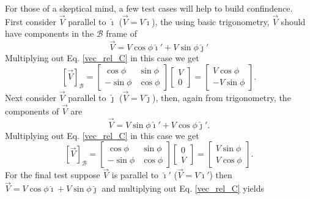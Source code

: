 \documentclass[10pt]{article}
\begin{document}
For those of a skeptical mind, a few test cases will help to build confindence.  First consider 
$\vec V$ parallel to $\hat \imath$ ($\vec V = V \hat \imath$), the using basic trigonometry,
$\vec V$ should have components in the $\mathcal B$ frame of
\begin{equation}\label{vec_test_A}
  \vec V = V \cos \phi \hat \imath' + V \sin \phi \hat \jmath'
\end{equation}
Multiplying out Eq. \ref{vec_rel_C} in this case we get
\begin{equation}
  \left[ \vec V \right]_{\mathcal B}
= \left[ \begin{array}{cc} \cos \phi & \sin \phi \\ -\sin \phi & \cos \phi \end{array} \right] 
  \left[ \begin{array}{c} V \\ 0 \end{array} \right]
= \left[ \begin{array}{c} V \cos \phi \\ -V \sin \phi \end{array} \right].
\end{equation}
Next consider $\vec V$ parallel to $\hat \jmath$ ($\vec V = V \hat \jmath$), then,
again from trigonometry, the components of $\vec V$ are
\begin{equation}\label{vec_test_B}
  \vec V = V \sin \phi \hat \imath' + V \cos \phi \hat \jmath' .
\end{equation}
Multiplying out Eq. \ref{vec_rel_C} in this case we get
\begin{equation}
  \left[ \vec V \right]_{\mathcal B}
= \left[ \begin{array}{cc} \cos \phi & \sin \phi \\ -\sin \phi & \cos \phi \end{array} \right] 
  \left[ \begin{array}{c} 0 \\ V \end{array} \right]
= \left[ \begin{array}{c} V \sin \phi \\ V \cos \phi \end{array} \right].
\end{equation}
For the final test suppose $\vec V$ is parallel to $\hat \imath'$ ($\vec V = V \hat \imath'$)
then $\vec V = V \cos \phi \hat \imath + V \sin \phi \hat \jmath$ and multiplying out Eq.
\ref{vec_rel_C} yields
\end{document}

